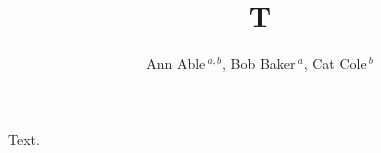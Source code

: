 \documentclass[sigconf]{acmart}
\begin{document}
\title{T}
\author{Ann Able$^{~a,b}$, Bob Baker$^{~a}$, Cat Cole$^{~b}$}
\maketitle
Text.
\end{document}
